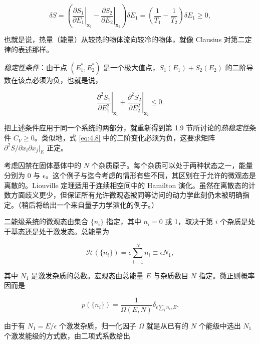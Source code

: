 \begin{equation}\label{eq:4.13}
  \delta S=\left(\left.\frac{\partial S_1}{\partial E_1}\right|_{\mathbf x_1}-\left.\frac{\partial S_2}{\partial E_2}\right|_{\mathbf x_2}\right)\delta E_1=\left(\frac{1}{T_1}-\frac{1}{T_2}\right)\delta E_1\ge0,
\end{equation}

也就是说，热量（能量）从较热的物体流向较冷的物体，就像 Clausius 对第二定律的表述那样。

\emph{稳定性条件}：由于点 $(E_1^*,E_2^*)$ 是一个极大值点，$S_1(E_1)+S_2(E_2)$ 的二阶导数在该点必须为负，也就是说，

\begin{equation}\label{eq:4.14}
  \left.\frac{\partial^2 S_1}{\partial E_1^2}\right|_{\mathbf x_1}+\left.\frac{\partial^2 S_2}{\partial E_2^2}\right|_{\mathbf x_2}\le0.
\end{equation}

把上述条件应用于同一个系统的两部分，就重新得到第 1.9 节所讨论的\emph{热稳定性}条件 $C_V\ge0$。类似地，式 \eqref{eq:4.8} 中的二阶变化必须为负，这要求矩阵 $\partial^2S/\partial x_i\partial x_j|_E$ 正定。


考虑囚禁在固体基体中的 $N$ 个杂质原子。每个杂质可以处于两种状态之一，能量分别为 0 与 $\epsilon$。这个例子与迄今考虑的情形有些不同，其区别在于允许的微观态是离散的。Liouville 定理适用于连续相空间中的 Hamilton 演化。虽然在离散态的计数方面歧义更少，但保证所有允许微观态被同等访问的动力学此刻仍未被明确指定。（稍后将给出一个来自量子力学演化的例子。）

二能级系统的微观态由集合 $\{n_i\}$ 指定，其中 $n_i=0$ 或 1，取决于第 $i$ 个杂质是处于基态还是处于激发态。总能量为

\begin{equation}\label{eq:4.15}
  \mathscr H(\{n_i\})=\epsilon\sum_{i=1}^N n_i\equiv\epsilon N_1,
\end{equation}

其中 $N_1$ 是激发杂质的总数。宏观态由总能量 $E$ 与杂质数目 $N$ 指定。微正则概率因而是

\begin{equation}\label{eq:4.16}
  p\left(\{n_i\}\right)=\frac{1}{\Omega(E,N)}\delta_{\epsilon\sum_i n_i,E}.
\end{equation}

由于有 $N_1=E/\epsilon$ 个激发杂质，归一化因子 $\Omega$ 就是从已有的 $N$ 个能级中选出 $N_1$ 个激发能级的方式数，由二项式系数给出


